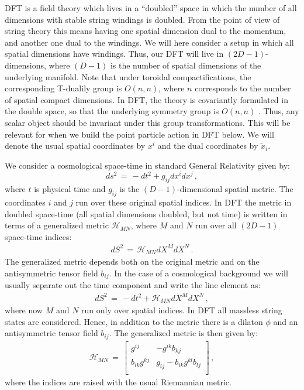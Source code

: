 \documentclass[prd, aps, superscriptaddress, preprintnumbers, twocolumn, floatfix, nofootinbib]{revtex4}
\begin{document}
DFT is a field theory which lives in a ``doubled'' space in which the
number of all dimensions with stable string windings is doubled. From
the point of view of string theory this means having one spatial dimension
dual to the momentum, and another one dual to the windings. We
will here consider a setup in which all spatial dimensions have windings.
Thus, our DFT will live in $(2D -1)$-dimensions, where $(D-1)$ is the number
of spatial dimensions of the underlying manifold. Note that under toroidal compactifications, the corresponding T-dualily group  is $O(n,n)$, where $n$ corresponds to the number of spatial compact dimensions. In DFT, the theory is covariantly formulated in the double space, so that the underlying symmetry group is $O(n,n)$ \cite{DFTrev}. Thus, any scalar object should be invariant under this group transformations. This will be relevant for when we build the point particle action in DFT below. We will denote the
usual spatial coordinates by $x^i$ and the dual coordinates by ${\tilde{x}_i}$.

We consider a cosmological space-time in standard General Relativity given by:
\begin{equation} \label{metricGR}
ds^2 \, = \, - dt^2 + g_{ij} dx^i dx^j \, ,
\end{equation}
where $t$ is physical time and $g_{ij}$ is the $(D-1)$-dimensional spatial metric.
The coordinates $i$ and $j$ run over these original spatial indices. In DFT
the metric in doubled space-time (all spatial dimensions doubled, but
not time) is written in terms of a generalized metric $\mathcal{H}_{MN}$,
where $M$ and $N$ run over all $(2D - 1)$ space-time indices:
\begin{eqnarray}
\label{metricDFT}
dS^2 \, = \, \mathcal{H}_{MN}dX^M dX^N \, .
\end{eqnarray}
The generalized metric depends both on the original metric and on
the antisymmetric tensor field $b_{ij}$. In the case of a cosmological
background we will usually separate out the time component and
write the line element as:
\begin{eqnarray}
\label{metricDFTcosmo}
dS^2 \, =  \, - dt^2 + \mathcal{H}_{MN}dX^M dX^N \, ,
\end{eqnarray}
where now $M$ and $N$ run only over spatial indices.
In DFT all massless string states are considered. Hence, in addition to
the metric there is a dilaton $\phi$ and an antisymmetric tensor
field $b_{ij}$.  The generalized metric is then given by:
\begin{eqnarray}
\mathcal{H}_{MN} \, = \,
\begin{bmatrix}
g^{ij} & -g^{ik}b_{kj} \\
b_{ik}g^{kj} & g_{ij}-b_{ik}g^{kl}b_{lj} \\
\end{bmatrix} \, ,
\end{eqnarray}
where the indices are raised with the usual Riemannian metric.
\end{document}
